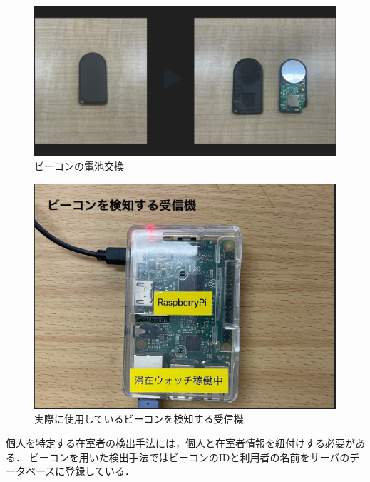 \begin{figure}[H]
  \begin{center}
    \includegraphics[width=150mm]{image/batchange.png}
    \caption{ビーコンの電池交換}
    \label{fig:batchange}
  \end{center}
\end{figure}

\begin{figure}[H]
  \begin{center}
    \includegraphics[width=150mm]{image/RasPi.jpg}
    \caption{実際に使用しているビーコンを検知する受信機}
    \label{fig:raspi}
  \end{center}
\end{figure}

個人を特定する在室者の検出手法には，個人と在室者情報を紐付けする必要がある．
ビーコンを用いた検出手法ではビーコンのIDと利用者の名前をサーバのデータベースに登録している．

